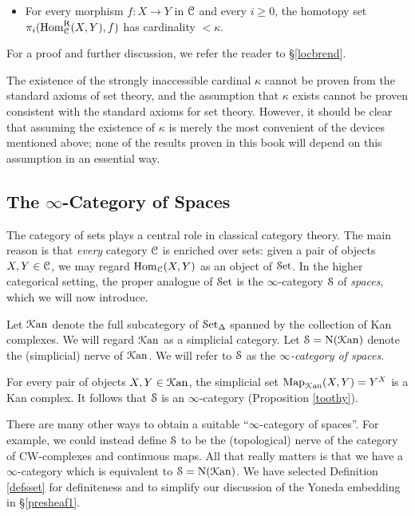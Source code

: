 \begin{Didn't Read}
\begin{itemize}
\item For every morphism $f: X \rightarrow Y$ in $\operatorname{\mathcal{C}}$ and every $i \geq 0$, the homotopy
set $\pi_{i}( \operatorname{Hom}^{\operatorname{R}}_{\operatorname{\mathcal{C}}}(X,Y), f)$ has cardinality $< \kappa$.
\end{itemize}

For a proof and further discussion, we refer the reader to \S \ref{locbrend}.

\begin{remark}
The existence of the strongly inaccessible cardinal $\kappa$ cannot be proven from the standard axioms of set theory, and the assumption that $\kappa$ exists cannot be proven consistent with the standard axioms for set theory. However, it should be clear that assuming the existence of $\kappa$ is merely the most convenient of the devices mentioned above; none of the results proven in this book will depend on this assumption in an essential way.
\end{remark}

\subsection{The $\infty$-Category of Spaces}\label{introducingspaces}

The category of sets plays a central role in classical category theory. The main reason
is that {\em every} category $\operatorname{\mathcal{C}}$ is enriched over sets: given a pair of objects
$X,Y \in \operatorname{\mathcal{C}}$, we may regard $\operatorname{Hom}_{\operatorname{\mathcal{C}}}(X,Y)$ as an object of $\operatorname{\mathcal{S}et}$.
In the higher categorical setting, the proper analogue of $\operatorname{\mathcal{S}et}$ is the
$\infty$-category $\operatorname{\mathcal{S}}$ of {\it spaces}, which we will now
introduce.

\begin{definition}\label{defsset}
Let $\operatorname{\mathcal{K}an}$ denote the full subcategory of $\operatorname{\mathcal{S}et_{\Delta}}$ spanned by the collection of Kan complexes. 
We will regard $\operatorname{\mathcal{K}an}$ as a simplicial category. Let $\operatorname{\mathcal{S}} = \operatorname{N}(\operatorname{\mathcal{K}an})$ denote the (simplicial) nerve of $\operatorname{\mathcal{K}an}$. We will refer to $\operatorname{\mathcal{S}}$ as the {\it $\infty$-category of spaces}.
\end{definition}

\begin{remark}
For every pair of objects $X,Y \in \operatorname{\mathcal{K}an}$, the simplicial set
$\operatorname{{Map}}_{\operatorname{\mathcal{K}an}}(X,Y) = Y^X$ is a Kan complex. It follows that
$\operatorname{\mathcal{S}}$ is an $\infty$-category (Proposition \ref{toothy}).
\end{remark}

\begin{remark}
There are many other ways to obtain a suitable ``$\infty$-category of
spaces''. For example, we could instead define $\operatorname{\mathcal{S}}$ to be the (topological) nerve
of the category of CW-complexes and continuous maps.
All that really matters is that we have a $\infty$-category which is equivalent to $\operatorname{\mathcal{S}} = \operatorname{N}(\operatorname{\mathcal{K}an})$. 
We have selected Definition \ref{defsset} for definiteness and to simplify our discussion of the
Yoneda embedding in \S \ref{presheaf1}.
\end{remark}


\end{Didn't Read}
